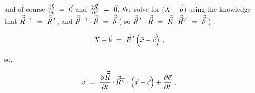 \documentclass{article}
\begin{document}
and of course \begin{math} \frac{\partial{\vec{b}}}{\partial{t}} \hspace{0.125cm} = \hspace{0.125cm} \vec{0} \end{math} and \begin{math} \frac{\partial{\vec{X}}}{\partial{t}} \hspace{0.125cm} = \hspace{0.125cm} \vec{0} \end{math}. We solve for \begin{math} \Big( \vec{X} - \vec{b} \Big) \end{math} using the knowledge that \begin{math} \vec{\vec{R}}^{-1} \hspace{0.125cm} = \hspace{0.125cm} \vec{\vec{R}}^{T} \end{math}, and \begin{math} \vec{\vec{R}}^{-1} \cdot \vec{\vec{R}} \hspace{0.125cm} = \hspace{0.125cm} \vec{\vec{\delta}} \end{math} ( so \begin{math} \vec{\vec{R}}^{T} \cdot \vec{\vec{R}} \hspace{0.125cm} = \hspace{0.125cm} \vec{\vec{R}} \cdot \vec{\vec{R}}^{T} \hspace{0.125cm} = \hspace{0.125cm} \vec{\vec{\delta}} \end{math} ) .

\begin{equation} \label{eb-eq-1-51}
\vec{X} - \vec{b}  \hspace{0.125cm} = \hspace{0.125cm} \vec{\vec{R}}^{T} \Big( \vec{x} - \vec{c} \Big)  \hspace{0.125cm}  ,  \hspace{0.125cm} 
\end{equation}

so,

\begin{equation} \label{eb-eq-1-52}
\vec{v} \hspace{0.125cm} = \hspace{0.125cm} \frac{\partial{\vec{\vec{R}}}}{\partial{t}} \cdot  \vec{\vec{R}}^{T} \cdot \Big( \vec{x} - \vec{c} \Big) + \frac{\partial{\vec{c}}}{\partial{t}} \hspace{0.125cm}  ,  \hspace{0.125cm} 
\end{equation}
\end{document}
